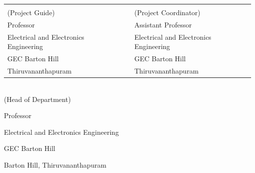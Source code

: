 \begin{singlespace}
	\vspace*{1.2cm}
	\begin{table}[h!]
		\centering
		\begin{tabular}{p{7cm} p{0.9cm} p{7cm}} 
			\textbf{\Supervisor} && \textbf{\Supervisorb} \\
			(Project Guide) &&  (Project Coordinator)\\
                Professor && Assistant Professor\\
			Electrical and Electronics Engineering && Electrical and Electronics Engineering\\ 
			GEC Barton Hill && GEC Barton Hill\\
			Thiruvananthapuram && Thiruvananthapuram\\
		\end{tabular}
		
	\end{table}
	
	\vspace*{1cm}
	
	\begin{center}
		\centering
		
		\textbf{\Supervisora} \\ 
		(Head of Department)
  
            Professor
		
		Electrical and Electronics Engineering
		
		GEC Barton Hill
		
		Barton Hill, Thiruvananthapuram
		
	\end{center}
\end{singlespace}


\thispagestyle{empty}